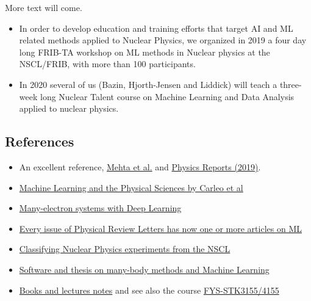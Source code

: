 \documentclass[%
oneside,                 %
final,                   %
10pt]{article}
\newenvironment{block_mdfboxadmon}[1][]{
\begin{block_mdfboxmdframed}[frametitle=#1]
}
{
\end{block_mdfboxmdframed}
}
\begin{document}
More text will come.

\begin{itemize}
\item In order to develop education and training efforts that target AI and ML related methods applied to Nuclear Physics, we  organized in 2019 a four day long  FRIB-TA workshop on ML methods in Nuclear physics at the NSCL/FRIB, with more than 100 participants.

\item In 2020 several of us (Bazin, Hjorth-Jensen and Liddick) will teach a three-week long Nuclear Talent course on Machine Learning and Data Analysis applied to nuclear physics. 
\end{itemize}

\noindent
\subsection{References}

\begin{block_mdfboxadmon}[]
\begin{itemize}
\item An excellent reference, \href{{https://arxiv.org/abs/1803.08823}}{Mehta et al.} and \href{{https://www.sciencedirect.com/science/article/pii/S0370157319300766?via%3Dihub}}{Physics Reports (2019)}.

\item \href{{https://arxiv.org/abs/1903.10563}}{Machine Learning and the Physical Sciences by Carleo et al}

\item \href{{https://arxiv.org/pdf/1909.02487.pdf}}{Many-electron systems with Deep Learning}

\item \href{{https://journals.aps.org/prl/abstract/10.1103/PhysRevLett.120.156001}}{Every issue of Physical Review Letters has now one or more articles on ML}

\item \href{{https://github.com/copperwire/thesis/blob/master/main.pdf}}{Classifying Nuclear Physics  experiments from the NSCL}

\item \href{{https://github.com/bsamseth/qflow}}{Software and thesis on many-body methods and Machine Learning}

\item \href{{https://github.com/CompPhysics/MachineLearning}}{Books and lectures notes} and see also the course \href{{https://www.uio.no/studier/emner/matnat/fys/FYS-STK4155/h18/index.html}}{FYS-STK3155/4155}
\end{itemize}

\noindent
\end{block_mdfboxadmon} %










\end{document}
